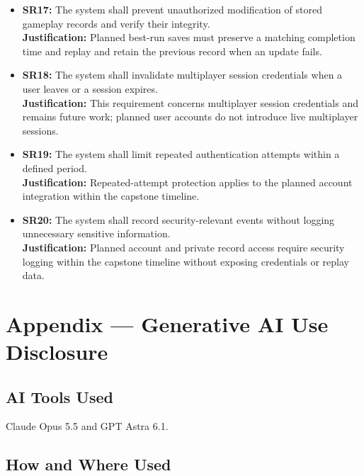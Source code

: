 \documentclass{article}
\newcommand{\reqref}[1]{#1}
\begin{document}
\begin{itemize}
    \item \textbf{\reqref{SR17}:} The system shall prevent unauthorized modification of stored gameplay records and verify their integrity.\\
    \textbf{Justification:} Planned best-run saves must preserve a matching completion time and replay and retain the previous record when an update fails.

    \item \textbf{\reqref{SR18}:} The system shall invalidate multiplayer session credentials when a user leaves or a session expires.\\
    \textbf{Justification:} This requirement concerns multiplayer session credentials and remains future work; planned user accounts do not introduce live multiplayer sessions.

    \item \textbf{\reqref{SR19}:} The system shall limit repeated authentication attempts within a defined period.\\
    \textbf{Justification:} Repeated-attempt protection applies to the planned account integration within the capstone timeline.

    \item \textbf{\reqref{SR20}:} The system shall record security-relevant events without logging unnecessary sensitive information.\\
    \textbf{Justification:} Planned account and private record access require security logging within the capstone timeline without exposing credentials or replay data.
\end{itemize}

\newpage{}

\section{Appendix --- Generative AI Use Disclosure}

\subsection{AI Tools Used}

Claude Opus 5.5 and GPT Astra 6.1.

\subsection{How and Where Used}
\end{document}

